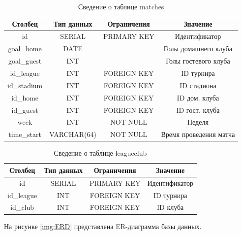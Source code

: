 \begin{table}[H]
	\begin{center}
		\caption{Сведение о таблице matches}
		\begin{tabular}{|c|c|c|c|}
			\hline
			Столбец & Тип данных & Ограничения & Значение \\
			\hline
			id & SERIAL & PRIMARY KEY & Идентификатор \\
			\hline
			goal\_home & DATE &  & Голы домашнего клуба \\
			\hline
			goal\_guest & INT &  & Голы гостевого клуба \\
			\hline
			id\_league & INT & FOREIGN KEY & ID турнира \\
			\hline
			id\_stadium & INT & FOREIGN KEY & ID стадиона \\
			\hline
			id\_home & INT & FOREIGN KEY & ID дом. клуба \\
			\hline
			id\_guest & INT & FOREIGN KEY & ID гост. клуба \\
			\hline
			week & INT & NOT NULL & Неделя \\
			\hline
			time\_start & VARCHAR(64) & NOT NULL & Время проведения матча \\
			\hline						
		\end{tabular}
		\label{table:db:match}
	\end{center}
\end{table}

\begin{table}[H]
	\begin{center}
		\caption{Сведение о таблице leagueclub}
		\begin{tabular}{|c|c|c|c|}
			\hline
			Столбец & Тип данных & Ограничения & Значение \\
			\hline
			id & SERIAL & PRIMARY KEY & Идентификатор \\
			\hline
			id\_league & INT & FOREIGN KEY & ID турнира \\
			\hline
			id\_club & INT & FOREIGN KEY & ID клуба \\
			\hline
		\end{tabular}
		\label{table:db:leagueclub}
	\end{center}
\end{table}

На рисунке \ref{img:ERD} представлена ER-диаграмма базы данных.

